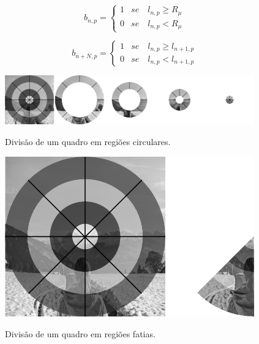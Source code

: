 \begin{equation}
	b_{n,p} = \left\{
    \begin{array}{lr}
      1 & se \quad l_{n,p} \geqslant R_\mu\\
      0 & se \quad l_{n,p} < R_\mu
    \end{array}
  \right.
  \label{eq:rbp_aneis}
\end{equation}

\begin{equation}
	b_{n+N,p} = \left\{
    \begin{array}{lr}
      1 & se \quad l_{n,p} \geqslant l_{n+1,p}\\
      0 & se \quad l_{n,p} < l_{n+1,p} 
    \end{array}
  \right.
  \label{eq:rbp_fatias}
\end{equation}


 \begin{figure}[h]
      \centering
      \caption{Divisão de um quadro em regiões circulares.}
      \includegraphics[width=0.96\textwidth]{dados/figuras/brp_aneis}
       	\label{fig:aneis_rbp}
    \end{figure} 
\begin{figure}[h]
      \centering
      \caption{Divisão de um quadro em regiões fatias.}
      \includegraphics[width=0.96\textwidth]{dados/figuras/brp_fatia}
       	\label{fig:fatias_rbp}
    \end{figure} 

